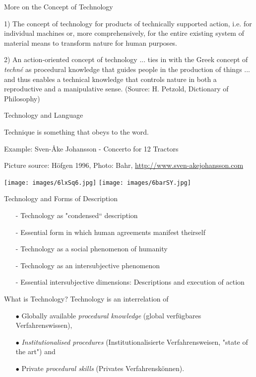 \documentclass{beamer}
\begin{document}
\begin{frame}{More on the Concept of Technology}

1) The concept of technology for products of technically supported action,
i.e. for individual machines or, more comprehensively, for the entire existing
system of material means to transform nature for human purposes.

2) An action-oriented concept of technology ... ties in with the Greek concept
of \emph{techné} as procedural knowledge that guides people in the production
of things ... and thus enables a technical knowledge that controls nature in
both a reproductive and a manipulative sense. (Source: H. Petzold, Dictionary
of Philosophy)

\end{frame}

\begin{frame}{Technology and Language}

Technique is something that obeys to the word.

Example: Sven-Åke Johansson - Concerto for 12 Tractors

Picture source: Höfgen 1996, Photo: Bahr,
\url{http://www.sven-akejohansson.com}

\begin{center}
  \texttt{[image: images/6lxSq6.jpg]}\hfill
  \texttt{[image: images/6barSY.jpg]}
\end{center}

\end{frame}

\begin{frame}{Technology and Forms of Description}
  \begin{itemize}
  \item[-] Technology as "condensed“ description
  \item[-] Essential form in which human agreements manifest theirself
  \item[-] Technology as a social phenomenon of humanity
  \item[-] Technology as an intersubjective phenomenon
  \item[-] Essential intersubjective dimensions: Descriptions and execution of
    action
  \end{itemize}
  \begin{block}{What is Technology?} 
    Technology is an interrelation of
    \begin{itemize}
    \item[$\bullet$] Globally available \emph{procedural knowledge}
      (global verfügbares Verfahrenswissen), 
    \item[$\bullet$] \emph{Institutionalised procedures} (Institutionalisierte
      Verfahrens\-weisen, "state of the art") and
    \item[$\bullet$] Private \emph{procedural skills} (Privates
      Verfahrenskönnen).
    \end{itemize}
  \end{block}
\end{frame}
\end{document}
